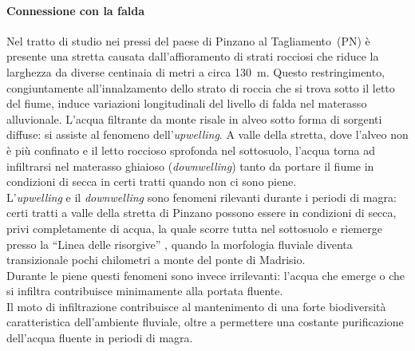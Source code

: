 \paragraph{Connessione con la falda}
Nel tratto di studio nei pressi del paese di Pinzano al Tagliamento~(PN) è presente una stretta causata dall'affioramento di strati rocciosi che riduce la larghezza da diverse centinaia di metri a circa \SI{130}{\m}.
Questo restringimento, congiuntamente all'innalzamento dello strato di roccia che si trova sotto il letto del fiume, induce variazioni longitudinali del livello di falda nel materasso alluvionale.
L'acqua filtrante da monte risale in alveo sotto forma di sorgenti diffuse: si assiste al fenomeno dell'\emph{upwelling}.
A valle della stretta, dove l'alveo non è più confinato e il letto roccioso sprofonda nel sottosuolo, l'acqua torna ad infiltrarsi nel materasso ghiaioso (\emph{downwelling}) tanto da portare il fiume in condizioni di secca in certi tratti quando non ci sono piene.
\\
L'\emph{upwelling} e il \emph{downwelling} sono fenomeni rilevanti durante i periodi di magra: certi tratti a valle della stretta di Pinzano possono essere in condizioni di secca, privi completamente di acqua, la quale scorre tutta nel sottosuolo e riemerge presso la “Linea delle risorgive” , quando la morfologia fluviale diventa transizionale pochi chilometri a monte del ponte di Madrisio.
\\
Durante le piene questi fenomeni sono invece irrilevanti: l'acqua che emerge o che si infiltra contribuisce minimamente alla portata fluente.
\\
Il moto di infiltrazione contribuisce al mantenimento di una forte biodiversità caratteristica dell'ambiente fluviale, oltre a permettere una costante purificazione dell'acqua fluente in periodi di magra.

